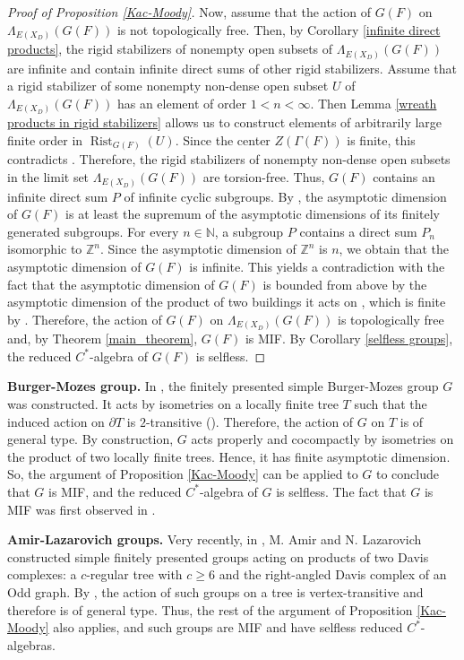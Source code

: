\documentclass[11pt,letterpaper]{article}
\newcommand{\NN}{\mathbb{N}}
\newcommand{\ZZ}{\mathbb{Z}}
\DeclareMathOperator{\rist}{Rist}
\theoremstyle{definition}
\theoremstyle{remark}
\begin{document}
\begin{proof}[Proof of Proposition \ref{Kac-Moody}]
    Now, assume that the action of $G(F)$ on $\Lambda_{E(X_D)}(G(F))$ is not topologically free. Then, by Corollary \ref{infinite direct products}, the rigid stabilizers of nonempty open subsets of $\Lambda_{E(X_D)}(G(F))$ are infinite and contain infinite direct sums of other rigid stabilizers. Assume that a rigid stabilizer of some nonempty non-dense open subset $U$ of $\Lambda_{E(X_D)}(G(F))$ has an element of order $1 < n < \infty$. Then Lemma \ref{wreath products in rigid stabilizers} allows us to construct elements of arbitrarily large finite order in $\rist_{G(F)}(U)$. Since the center $Z(\Gamma(F))$ is finite, this contradicts \cite[Corollary 1.3]{Cap}. Therefore, the rigid stabilizers of nonempty non-dense open subsets in the limit set $\Lambda_{E(X_D)}(G(F))$ are torsion-free. Thus, $G(F)$ contains an infinite direct sum $P$ of infinite cyclic subgroups. By \cite[Theorem 64]{BD}, the asymptotic dimension of $G(F)$ is at least the supremum of the asymptotic dimensions of its finitely generated subgroups. For every $n \in \NN$, a subgroup $P$ contains a direct sum $P_n$ isomorphic to $\ZZ^n$. Since the asymptotic dimension of $\ZZ^n$ is $n$, we obtain that the asymptotic dimension of $G(F)$ is infinite. This yields a contradiction with the fact that the asymptotic dimension of $G(F)$ is bounded from above by the asymptotic dimension of the product of two buildings it acts on \cite[last paragraph]{SWZ}, which is finite by \cite{DS}. Therefore, the action of $G(F)$ on $\Lambda_{E(X_D)}(G(F))$ is topologically free and, by Theorem \ref{main_theorem}, $G(F)$ is MIF. By Corollary \ref{selfless groups}, the reduced $C^*$-algebra of $G(F)$ is selfless.
    \end{proof}

{\bf Burger-Mozes group.} In \cite{BM97}, the finitely presented simple Burger-Mozes group $G$ was constructed. It acts by isometries on a locally finite tree $T$ such that the induced action on $\partial T$ is $2$-transitive (\cite[Remark 5]{BM97}). Therefore, the action of $G$ on $T$ is of general type. By construction, $G$ acts properly and cocompactly by isometries on the product of two locally finite trees. Hence, it has finite asymptotic dimension. So, the argument of Proposition \ref{Kac-Moody} can be applied to $G$ to conclude that $G$ is MIF, and the reduced $C^*$-algebra of $G$ is selfless.   
The fact that $G$ is MIF was first observed in \cite[Remark 3.5]{BFFHZ}.

{\bf Amir-Lazarovich groups.}
Very recently, in \cite{AL}, M. Amir and N. Lazarovich constructed simple finitely presented groups acting on products of two Davis complexes: a $c$-regular tree with $c \geq 6$ and the right-angled Davis complex of an Odd graph. By \cite[Theorem 5.2]{AL}, the action of such groups on a tree is vertex-transitive and therefore is of general type. Thus, the rest of the argument of Proposition \ref{Kac-Moody} also applies, and such groups are MIF and have selfless reduced $C^*$-algebras.
\end{document}
